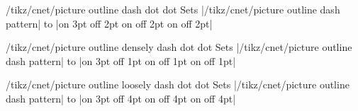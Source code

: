\documentclass[a4paper]{ltxdoc}
\begin{document}
\begin{stylekey}{/tikz/cnet/picture outline dash dot dot}
  Sets |/tikz/cnet/picture outline dash pattern| to |on 3pt off 2pt on \the\pgflinewidth off 2pt on \the\pgflinewidth off 2pt|
\end{stylekey}

\begin{stylekey}{/tikz/cnet/picture outline densely dash dot dot}
  Sets |/tikz/cnet/picture outline dash pattern| to |on 3pt off 1pt on \the\pgflinewidth off 1pt on \the\pgflinewidth off 1pt|
\end{stylekey}

\begin{stylekey}{/tikz/cnet/picture outline loosely dash dot dot}
  Sets |/tikz/cnet/picture outline dash pattern| to |on 3pt off 4pt on \the\pgflinewidth off 4pt on \the\pgflinewidth off 4pt|
\end{stylekey}
\end{document}
